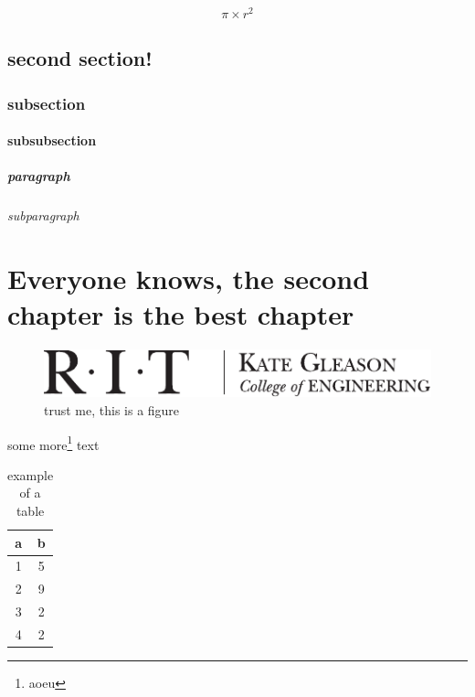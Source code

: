 \documentclass{ritthesis}
\begin{document}
\begin{equation}
\pi\times r^2
\label{equ:area}
\end{equation}

\section{second section!}

\subsection{subsection}

\subsubsection{subsubsection}

\paragraph{paragraph}

\subparagraph{subparagraph}

\lipsum{}
\chapter{Everyone knows, the second chapter is the best chapter}
\lipsum{}

\begin{figure}
\centering
\includegraphics{kgcoelogohoriz}
\caption{trust me, this is a figure}
\label{fig:samp}
\end{figure}

some more\footnote{aoeu} text

\begin{table}
\centering
\caption{example of a table}
\label{tab:samp}
\begin{tabular}{cc}
\hline
a		& b\\
\hline
1		& 5\\
2		& 9\\
3		& 2\\
4		& 2\\
\hline
\end{tabular}
\end{table}
\end{document}
